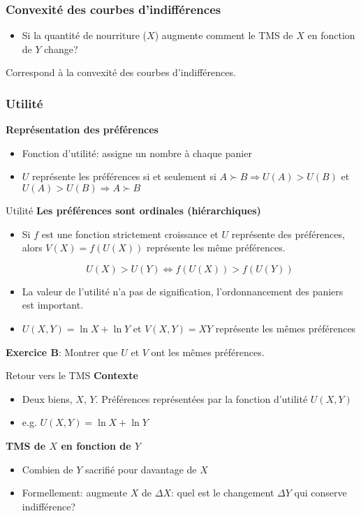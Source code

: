 \documentclass[handout]{beamer}
\begin{document}
\begin{frame}\frametitle{Convexité des courbes d'indifférences}
\begin{itemize}
\item Si la quantité de nourriture ($X$) augmente comment le TMS de $X$ en fonction de $Y$ change?
\end{itemize}

Correspond à la convexité des courbes d'indifférences. 
\end{frame}

\begin{frame}\frametitle{Utilité}

\textbf{Représentation des préférences}
\begin{itemize}
\item  Fonction d'utilité: assigne un nombre à chaque panier
\item $U$ représente les préférences si et seulement si $ A \succ B \Rightarrow U(A) > U(B)$ et 
$ U(A) > U(B)   \Rightarrow A \succ B$
\end{itemize}
\vfill
\end{frame}

\begin{frame}{Utilité}
\textbf{Les préférences sont ordinales (hiérarchiques)}
\begin{itemize}
\item Si $f$ est une fonction strictement croissance et $U$ représente des préférences, alors $V(X) = f(U(X))$ représente les même préférences.

$$ U(X) > U(Y) \iff f(U(X)) > f(U(Y))$$
\item La valeur de l'utilité n'a pas de signification, l'ordonnancement des paniers est important.
\item $U(X,Y) = \ln X + \ln Y$ et $V(X,Y) = XY$ représente les mêmes préférences
\end{itemize}
\textbf{Exercice B}: Montrer que $U$ et $V$ ont les mêmes préférences. 
\end{frame}


\begin{frame}{Retour vers le TMS}
\textbf{Contexte}
\begin{itemize}
\item Deux biens, $X$, $Y$.  Préférences représentées par la fonction d'utilité $U(X,Y)$
\item e.g. $U(X,Y) = \ln X + \ln Y$
\end{itemize}
\textbf{TMS de $X$ en fonction de $Y$} \pause
\begin{itemize}
\item Combien de $Y$ sacrifié pour davantage de $X$\pause
\item Formellement: augmente $X$ de $\Delta X$: quel est le changement $\Delta Y $ qui conserve indifférence?
\end{itemize}
\end{frame}
\end{document}
